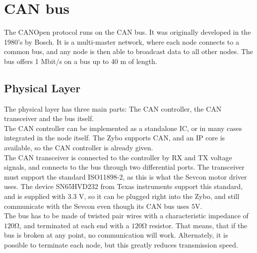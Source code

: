 
\section{CAN bus}\label{sec:CANbus}
The CANOpen protocol runs on the CAN bus.
It was originally developed in the 1980's by Bosch.
It is a multi-master network, where each node connects to a common bus, and any node is then able to broadcast data to all other nodes.
The bus offers 1 Mbit/s on a bus up to 40 m of length. 
\subsection{Physical Layer}\label{sub:CANphys}
The physical layer has three main parts: The CAN controller, the CAN transceiver and the bus itself. \\

The CAN controller can be implemented as a standalone IC, or in many cases integrated in the node itself.
The Zybo supports CAN, and an IP core is available, so the CAN controller is already given.\\

The CAN transceiver is connected to the controller by RX and TX voltage signals, and connects to the bus through two differential ports. 
The transceiver must support the standard ISO11898-2, as this is what the Sevcon motor driver uses.
The device SN65HVD232 from Texas instruments support this standard, and is supplied with 3.3 V, so it can be plugged right into the Zybo, and still communicate with the Sevcon even though its CAN bus uses $\si{5 \volt}$.\\

The bus has to be made of twisted pair wires with a characteristic impedance of $\si{120 \ohm}$, and terminated at each end with a $\si{120 \ohm}$ resistor.
That means, that if the bus is broken at any point, no communication will work.
Alternately, it is possible to terminate each node, but this greatly reduces transmission speed.